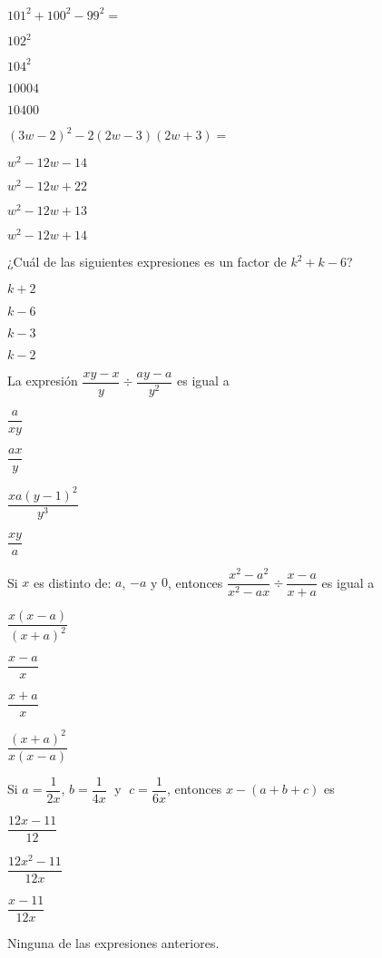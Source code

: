 \documentclass{sn-guia}
\begin{document}
\begin{preguntas}
    \pregunta $101^2 + 100^2 - 99^2 =$
    \begin{alternativas}[]
        \item $102^2$
        \item $104^2$
        \item $10004$
        \item $10400$
    \end{alternativas}

    \pregunta $(3w-2)^2-2(2w-3)(2w+3)=$
    \begin{alternativas}[]
        \item $w^2-12w-14$
        \item $w^2-12w+22$
        \item $w^2-12w+13$
        \item $w^2-12w+14$
    \end{alternativas}

    \pregunta ¿Cuál de las siguientes expresiones es un factor de $k^2+k-6$?
    \begin{alternativas}[]
        \item $k+2$
        \item $k-6$
        \item $k-3$
        \item $k-2$
    \end{alternativas}

    \pregunta La expresión $\dfrac{xy-x}{y}\div \dfrac{ay-a}{y^2}$ es igual a
    \begin{alternativas}[]
        \item $\dfrac{a}{xy}$
        \item $\dfrac{ax}{y}$
        \item $\dfrac{xa(y-1)^2}{y^3}$
        \item $\dfrac{xy}{a}$
    \end{alternativas}

    \pregunta Si $x$ es distinto de: $a$, $-a$ y $0$, entonces 
    $\dfrac{x^2-a^2}{x^2-ax}\div\dfrac{x-a}{x+a}$ es igual a
    \begin{alternativas}[]
        \item $\dfrac{x(x-a)}{(x+a)^2}$
        \item $\dfrac{x-a}{x}$
        \item $\dfrac{x+a}{x}$
        \item $\dfrac{(x+a)^2}{x(x-a)}$
    \end{alternativas}
    
    \pregunta Si $a = \dfrac{1}{2x}$, $b=\dfrac{1}{4x}\;$ y $\;c=\dfrac{1}{6x}$, entonces 
    $x-(a+b+c)$ es
    \begin{alternativas}[]
        \item $\dfrac{12x-11}{12}$
        \item $\dfrac{12x^2-11}{12x}$
        \item $\dfrac{x-11}{12x}$
        \item Ninguna de las expresiones anteriores.
    \end{alternativas}


\end{preguntas}
\end{document}
